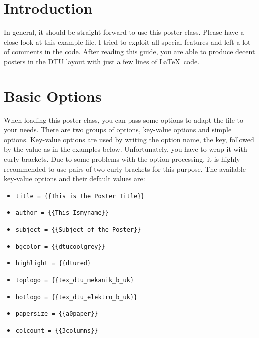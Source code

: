 \documentclass[
]{dtuposter}
\begin{document}
%
%
\begin{dtuposterhead} %
\end{dtuposterhead}
%
%
\begin{dtupostercontent}
\section{Introduction}
In general, it should be straight forward to use this poster class. Please
have a close look at this example file. I tried to exploit all special 
features and left a lot of comments in the code. After reading this 
guide, you are able to produce decent posters in the DTU layout with
just a few lines of \LaTeX\ code. 

\section{Basic Options}
When loading this poster class, you can pass some options to adapt the 
file to your needs. There are two groups of options, key-value options 
and simple options. Key-value options are used by writing the option 
name, the key, followed by the value as in the examples below. 
Unfortunately, you have to
wrap it with curly brackets. Due to some problems with the option 
processing, it is highly recommended to use pairs of two curly brackets
for this purpose. The available key-value options and their 
default values are:
\begin{itemize}
\item \texttt{title     = \{\{This is the Poster Title\}\}}
\item \texttt{author    = \{\{This Ismyname\}\}}
\item \texttt{subject   = \{\{Subject of the Poster\}\}}
\item \texttt{bgcolor   = \{\{dtucoolgrey\}\}}
\item \texttt{highlight = \{\{dtured\}}
\item \texttt{toplogo   = \{\{tex\_dtu\_mekanik\_b\_uk\}}
\item \texttt{botlogo   = \{\{tex\_dtu\_elektro\_b\_uk\}\}}
\item \texttt{papersize = \{\{a0paper\}\}}
\item \texttt{colcount  = \{\{3columns\}\}}
\end{itemize}


\end{dtupostercontent}
\end{document}
